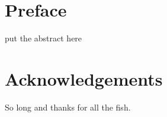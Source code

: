 \documentclass
[
  a4paper,
  12pt,
  oneside,
  openright,
  chapterprefix,
  bibtotoc,
  idxtotoc,
] {scrbook} %
\begin{document}
\frontmatter


\chapter{Preface}
\thispagestyle{empty}
put the abstract here
\clearpage


\chapter{Acknowledgements}
\thispagestyle{empty}
So long and thanks for all the fish.
\clearpage


\newpage
\tableofcontents
\thispagestyle{empty}
\clearpage

\listoffigures      %
\thispagestyle{empty}
\clearpage

\mainmatter








\appendix
\def\chaptername{Appendix}
%
%



\renewcommand{\bibname}{List of References}




\printindex



\end{document}
